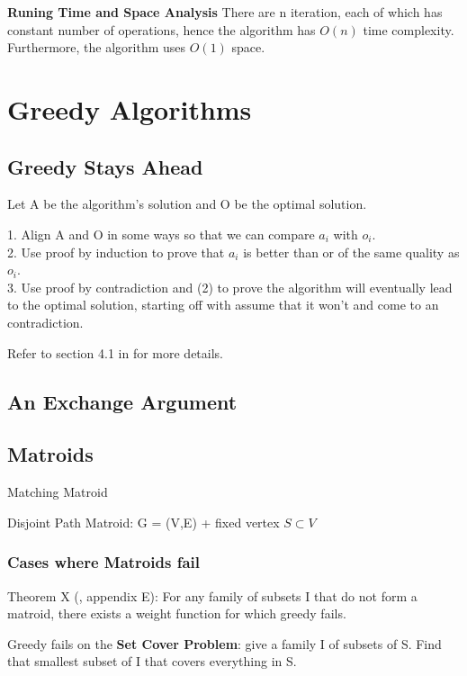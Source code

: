 \documentclass[12pt,article]{article}
\begin{document}
\textbf{Runing Time and Space Analysis}
There are n iteration, each of which has constant number of operations, hence the algorithm has $O(n)$ time complexity. Furthermore, the algorithm uses $O(1)$ space.

\newpage
\section{Greedy Algorithms}
\subsection{Greedy Stays Ahead}
Let A be the algorithm's solution and O be the optimal solution. 

1. Align A and O in some ways so that we can compare $a_i$ with $o_i$. \\
2. Use proof by induction to prove that $a_i$ is better than or of the same quality as $o_i$. \\
3. Use proof by contradiction and (2) to prove the algorithm will eventually lead to the optimal solution, starting off with assume that it won't and come to an contradiction.

Refer to section 4.1 in \cite{kleinbergalgorithm} for more details.
\newpage
\subsection{An Exchange Argument}

\newpage
\subsection{Matroids}
Matching Matroid

Disjoint Path Matroid: G = (V,E) + fixed vertex $S \subset V$

\subsubsection{Cases where Matroids fail}

Theorem X (\cite{JeffE19}, appendix E): For any family of subsets I that do not form a matroid, there exists a weight function for which greedy fails.

Greedy fails on the \textbf{Set Cover Problem}: give a family I of subsets of S. Find that smallest subset of I that covers everything in S. 
\end{document}
